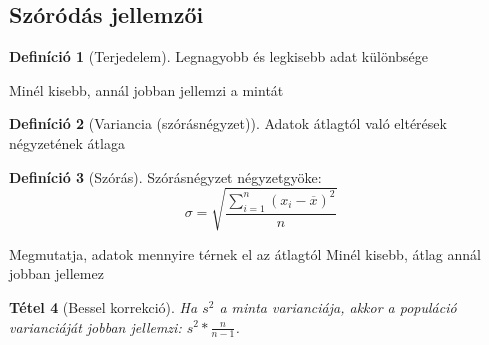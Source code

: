\documentclass[twoside,12pt]{report}
\newtheorem{theorem}{Tétel}[section]
\theoremstyle{definition}
\newtheorem{definition}[theorem]{Definíció}
\begin{document}
	\subsection{Szóródás jellemzői}
	\begin{outline}
		\1[] \begin{definition}[Terjedelem]
				Legnagyobb és legkisebb adat különbsége
			\end{definition}
			\2 Minél kisebb, annál jobban jellemzi a mintát
		\1[] \begin{definition}[Variancia (szórásnégyzet)]
				Adatok átlagtól való eltérések négyzetének átlaga
			\end{definition}
		\1[] \begin{definition}[Szórás]
				Szórásnégyzet négyzetgyöke:
				\begin{equation*}
					\sigma=\sqrt{\frac{\sum_{i=1}^{n}\left(x_i-\overline{x}\right)^2}{n}}
				\end{equation*}
			\end{definition}
			\2 Megmutatja, adatok mennyire térnek el az átlagtól
			\2 Minél kisebb, átlag annál jobban jellemez
		\1[] 
		\begin{theorem}[Bessel korrekció]
			Ha $s^2$ a minta varianciája, akkor a populáció varianciáját jobban jellemzi: $s^2*\frac{n}{n-1}$.
		\end{theorem}
	\end{outline}
\end{document}

